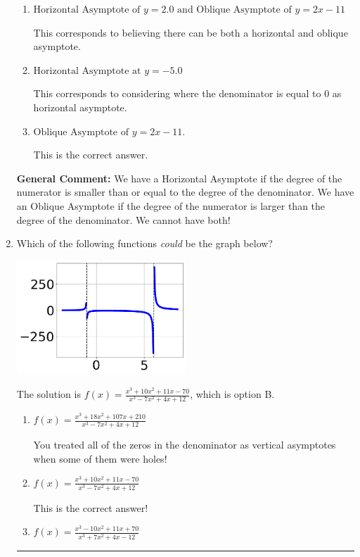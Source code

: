 \documentclass{extbook}[14pt]
\newcommand{\litem}[1]{\item #1

\rule{\textwidth}{0.4pt}}
\begin{document}
\begin{enumerate}
{\begin{enumerate}[label=\Alph*.]
This corresponds to using rule for Horizontal Asymptote when degree of numerator and denominator match.
\item \( \text{Horizontal Asymptote of } y = 2.0 \text{ and Oblique Asymptote of } y = 2x -11 \)

This corresponds to believing there can be both a horizontal and oblique asymptote.
\item \( \text{Horizontal Asymptote at } y = -5.0 \)

This corresponds to considering where the denominator is equal to 0 as horizontal asymptote.
\item \( \text{Oblique Asymptote of } y = 2x -11. \)

This is the correct answer.
\end{enumerate}

\textbf{General Comment:} We have a Horizontal Asymptote if the degree of the numerator is smaller than or equal to the degree of the denominator. We have an Oblique Asymptote if the degree of the numerator is larger than the degree of the denominator. We cannot have both!
}
\litem{
Which of the following functions \textit{could} be the graph below?

\begin{center}
    \includegraphics[width=0.5\textwidth]{../Figures/identifyGraphOfRationalFunctionC.png}
\end{center}




The solution is \( f(x)=\frac{x^{3} +10 x^{2} +11 x -70}{x^{3} -7 x^{2} +4 x + 12} \), which is option B.\begin{enumerate}[label=\Alph*.]
\item \( f(x)=\frac{x^{3} +18 x^{2} +107 x + 210}{x^{3} -7 x^{2} +4 x + 12} \)

You treated all of the zeros in the denominator as vertical asymptotes when some of them were holes!
\item \( f(x)=\frac{x^{3} +10 x^{2} +11 x -70}{x^{3} -7 x^{2} +4 x + 12} \)

This is the correct answer!
\item \( f(x)=\frac{x^{3} -10 x^{2} +11 x + 70}{x^{3} +7 x^{2} +4 x -12} \)


\end{enumerate}}
\end{enumerate}
\end{document}
